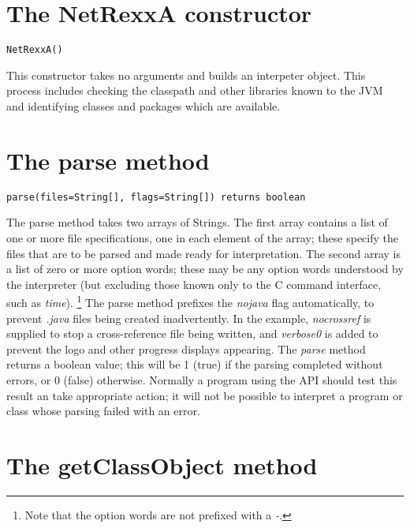 \section{The NetRexxA constructor}

\begin{lstlisting}[label=constructor,caption=Constructor]
NetRexxA()
\end{lstlisting}
This constructor takes no arguments and builds an interpeter object.
This process includes checking the classpath and other libraries known
to the JVM and identifying classes and packages which are available.
\section{The parse method}
\begin{lstlisting}[label=parse,caption=parse]
parse(files=String[], flags=String[]) returns boolean
\end{lstlisting}

The parse method takes two arrays of Strings.  The first array contains
a list of one or more file specifications, one in each element of the
array; these specify the files that are to be parsed and made ready for
interpretation.
\newline
The second array is a list of zero or more option words; these may be
any option words understood by the interpreter (but excluding those
known only to the \nr{}C command interface, such as \emph{time}).
\footnote{Note that the option words are not prefixed with a \emph{-}.}
The parse method prefixes the \emph{nojava} flag automatically, to
prevent \emph{.java} files being created inadvertently.  In the
example, \emph{nocrossref} is supplied to stop a cross-reference file
being written, and \emph{verbose0} is added to prevent the logo and
other progress displays appearing.
\newline
The \emph{parse} method returns a boolean value; this will be 1 (true)
if the parsing completed without errors, or 0 (false) otherwise.
Normally a program using the API should test this result an take
appropriate action; it will not be possible to interpret a program or
class whose parsing failed with an error.

\section{The getClassObject method}

